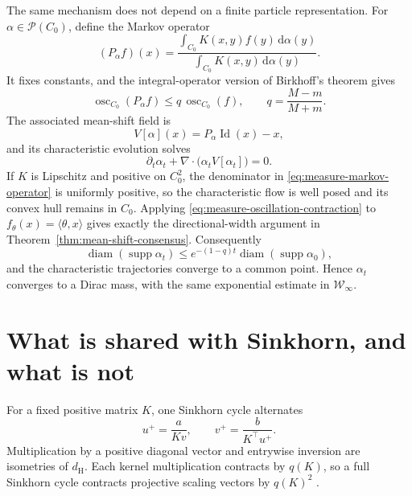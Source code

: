 \documentclass[11pt]{article}
\theoremstyle{definition}
\newcommand{\supp}{\operatorname{supp}}
\newcommand{\osc}{\operatorname{osc}}
\newcommand{\diam}{\operatorname{diam}}
\newcommand{\dH}{d_{\mathrm H}}
\newcommand{\dd}{\,\mathrm{d}}
\newcommand{\Pcal}{\mathcal{P}}
\newcommand{\Wass}{\mathcal{W}}
\begin{document}
The same mechanism does not depend on a finite particle representation.  For
$\alpha\in\Pcal(C_0)$, define the Markov operator
\begin{equation}\label{eq:measure-markov-operator}
  (P_\alpha f)(x)
  =
  \frac{\int_{C_0}K(x,y)f(y)\dd\alpha(y)}
       {\int_{C_0}K(x,y)\dd\alpha(y)}.
\end{equation}
It fixes constants, and the integral-operator version of Birkhoff's theorem
gives
\begin{equation}\label{eq:measure-oscillation-contraction}
  \osc_{C_0}(P_\alpha f)
  \leq
  q\,\osc_{C_0}(f),
  \qquad
  q=\frac{M-m}{M+m}.
\end{equation}
The associated mean-shift field is
\begin{equation}\label{eq:measure-mean-shift-field}
  V[\alpha](x)=P_\alpha\operatorname{Id}(x)-x,
\end{equation}
and its characteristic evolution solves
\begin{equation}\label{eq:measure-mean-shift-pde}
  \partial_t\alpha_t
  +\nabla\cdot\bigl(\alpha_tV[\alpha_t]\bigr)=0.
\end{equation}
If $K$ is Lipschitz and positive on $C_0^2$, the denominator in
\eqref{eq:measure-markov-operator} is uniformly positive, so the characteristic
flow is well posed and its convex hull remains in $C_0$.  Applying
\eqref{eq:measure-oscillation-contraction} to
$f_\theta(x)=\langle\theta,x\rangle$ gives exactly the directional-width
argument in Theorem~\ref{thm:mean-shift-consensus}.  Consequently
\begin{equation}\label{eq:measure-diameter-rate}
  \diam(\supp\alpha_t)
  \leq
  e^{-(1-q)t}\diam(\supp\alpha_0),
\end{equation}
and the characteristic trajectories converge to a common point.  Hence
$\alpha_t$ converges to a Dirac mass, with the same exponential estimate in
$\Wass_\infty$.

\section{What is shared with Sinkhorn, and what is not}

For a fixed positive matrix $K$, one Sinkhorn cycle alternates
\begin{equation}\label{eq:sinkhorn-half-steps}
  u^+=\frac{a}{Kv},
  \qquad
  v^+=\frac{b}{K^\top u^+}.
\end{equation}
Multiplication by a positive diagonal vector and entrywise inversion are
isometries of $\dH$.  Each kernel multiplication contracts by $q(K)$, so a
full Sinkhorn cycle contracts projective scaling vectors by $q(K)^2$
\cite{FranklinLorenz1989}.
\end{document}
